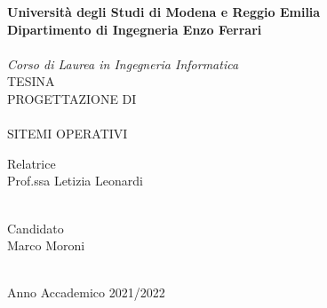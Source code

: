 \documentclass[12pt,a4paper]{article}
\begin{document}
\begin{titlepage}
    \begin{center}
    {

        \large
        \textbf{Università  degli Studi di Modena e Reggio Emilia} \\
        \textbf{Dipartimento di Ingegneria Enzo Ferrari} \\
        \hspace*{0cm} \hrulefill \hspace*{0cm} \\
        \emph{Corso di Laurea in Ingegneria Informatica}
        \vspace{5mm}
        \vspace{25mm}
        \huge{\uppercase{
        \\Tesina\\
        progettazione di\\
        \\sitemi operativi\\}}}
        \vspace{5mm}


    \end{center}
    \vspace{25mm}
    \par
    \noindent
    \begin{minipage}[t]{0.47\textwidth}
        {\large{ Relatrice\\
        Prof.ssa Letizia Leonardi}}\\
        \\
    \end{minipage}
    \hfill
    \begin{minipage}[t]{0.47\textwidth}\raggedleft
        {\large{ Candidato\\
        Marco Moroni}}
    \end{minipage}
    \vspace{20mm}
    \begin{center}
        \hspace*{0cm} \hrulefill \hspace*{0cm} \\
        {\large{
        Anno Accademico 2021/2022}}
    \end{center}

\end{titlepage}
\end{document}
